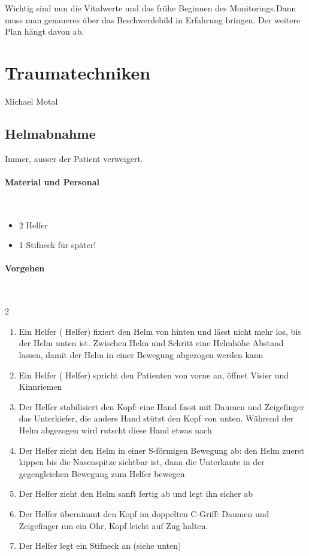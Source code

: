 Wichtig sind nun die Vitalwerte und das frühe Beginnen des
Monitorings.Dann muss man genaueres über das Beschwerdebild in
Erfahrung bringen. Der weitere Plan hängt davon ab.


\section{Traumatechniken}
Michael Motal

\subsection{Helmabnahme}
\label{topic:helmabnahme}

Immer, ausser der Patient verweigert.

\paragraph*{Material und Personal}~

\begin{itemize}
\item 2 Helfer
\item 1 Stifneck für später!
\end{itemize}

\paragraph*{Vorgehen}~

\begin{multicols}{2}
\begin{enumerate}
    \item Ein Helfer ( Helfer) fixiert den Helm von hinten und lässt nicht mehr los,
    bis der Helm unten ist. Zwischen Helm und Schritt eine Helmhöhe
    Abstand lassen, damit der Helm in einer Bewegung abgezogen werden kann
    \item Ein Helfer ( Helfer) spricht den Patienten von vorne an, öffnet Visier und
    Kinnriemen
    \item Der  Helfer stabilisiert den Kopf: eine Hand fasst mit
    Daumen und Zeigefinger das Unterkiefer, die andere Hand stützt den
    Kopf von unten. Während der Helm abgezogen wird rutscht diese Hand
    etwas nach
    \item Der  Helfer zieht den Helm in einer S-förmigen Bewegung
    ab: den Helm zuerst kippen bis die Nasenspitze sichtbar ist, dann die
    Unterkante in der gegengleichen Bewegung zum Helfer bewegen
    \item Der  Helfer zieht den Helm sanft fertig ab und legt ihn
    sicher ab
    \item Der  Helfer übernimmt den Kopf im doppelten C-Griff:
    Daumen und Zeigefinger um ein Ohr, Kopf leicht auf Zug halten.
    \item Der  Helfer legt ein Stifneck an (siehe unten)
\end{enumerate}
\end{multicols}

